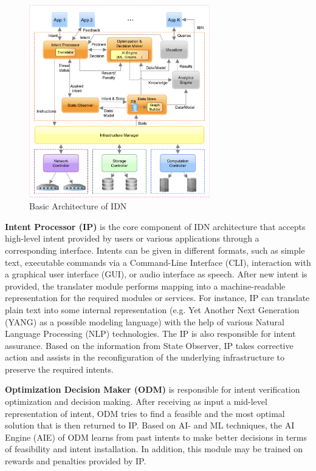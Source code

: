 \begin{figure}[htb]
  \centering
  \includegraphics[width=0.7\textwidth]{figures/IBN_Architecture.png}
  \caption{Basic Architecture of IDN\cite{Saha2018}}
  \label{fig:IDN_Architecture}
\end{figure}

\textbf{Intent Processor (IP)} is the core component of IDN architecture that accepts high-level intent provided by users or various applications through a corresponding interface. Intents can be given in different formats, such as simple text, executable commands via a Command-Line Interface (CLI), interaction with a graphical user interface (GUI), or audio interface as speech. After new intent is provided, the translater module performs mapping into a machine-readable representation for the required modules or services. For instance, IP can translate plain text into some internal representation (e.g. Yet Another Next Generation (YANG) as a possible modeling language) with the help of various Natural Language Processing (NLP) technologies\cite[15]{Mehmood2021}. The IP is also responsible for intent assurance. Based on the information from State Observer, IP takes corrective action and assists in the reconfiguration of the underlying infrastructure to preserve the required intents.

\textbf{Optimization Decision Maker (ODM)} is responsible for intent verification optimization and decision making. After receiving as input a mid-level representation of intent, ODM tries to find a feasible and the most optimal solution that is then returned to IP. Based on AI- and ML techniques, the AI Engine (AIE) of ODM learns from past intents to make better decisions in terms of feasibility and intent installation. In addition, this module may be trained on rewards and penalties provided by IP.

